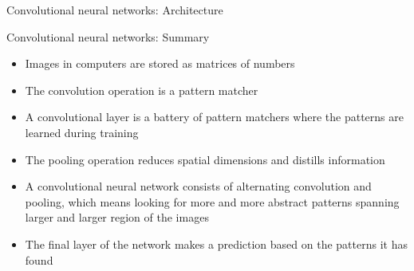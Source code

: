 \documentclass[t]{beamer}
\begin{document}
\begin{frame}{Convolutional neural networks: Architecture}
		\vfill
	\end{frame}

	\begin{frame}{Convolutional neural networks: Summary}
		\begin{itemize}
			\item Images in computers are stored as matrices of numbers
			\item The convolution operation is a pattern matcher
			\item A convolutional layer is a battery of pattern matchers where the patterns are learned during training
			\item The pooling operation reduces spatial dimensions and distills information
			\item A convolutional neural network consists of alternating convolution and pooling, which means looking for more and more abstract patterns spanning larger and larger region of the images
			\item The final layer of the network makes a prediction based on the patterns it has found
		\end{itemize}
	\end{frame}
\end{document}
